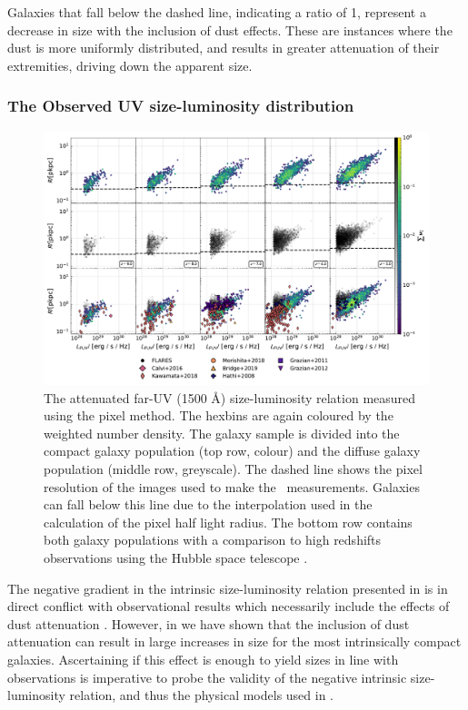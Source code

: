 Galaxies that fall below the dashed line, indicating a ratio of 1, represent a decrease in size with the inclusion of dust effects. These are instances where the dust is more uniformly distributed, and results in greater attenuation of their extremities, driving down the apparent size.

\subsubsection{The Observed UV size-luminosity distribution}

\begin{figure}
  \includegraphics[width=\linewidth]{Figures/HalfLightRadius_pix_FAKE.TH.FUV_sim_Total_default.pdf}
  \caption{The attenuated far-UV (1500 \AA) size-luminosity relation measured using the pixel method. The hexbins are again coloured by the weighted number density. The galaxy sample is divided into the compact galaxy population (top row, colour) and the diffuse galaxy population (middle row, greyscale). The dashed line shows the pixel resolution of the images used to make the \flares\ measurements. Galaxies can fall below this line due to the interpolation used in the calculation of the pixel half light radius. The bottom row contains both galaxy populations with a comparison to high redshifts observations using the Hubble space telescope \citep{Hathi_2008, Grazian2011, Grazian_2012, Calvi_2016, Kawamata_2018, Morishita_2018, Bridge_2019}.}
  \label{fig:HLR_with_dust_obscomp}
\end{figure}


The negative gradient in the intrinsic size-luminosity relation presented in  is in direct conflict with observational results which necessarily include the effects of dust attenuation \citep[e.g.][]{Hathi_2008, Grazian2011, Grazian_2012, Shibuya2015, Calvi_2016, Kawamata_2015, Kawamata_2018, Morishita_2018, Bridge_2019, Bouwens2021, Yang2022}. However, in  we have shown that the inclusion of dust attenuation can result in large increases in size for the most intrinsically compact galaxies. Ascertaining if this effect is enough to yield sizes in line with observations is imperative to probe the validity of the negative intrinsic size-luminosity relation, and thus the physical models used in \flares. 

